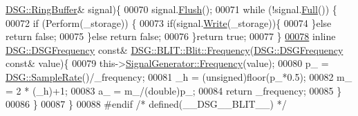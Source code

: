 \begin{DoxyCode}
      \hyperlink{class_d_s_g_1_1_ring_buffer}{DSG::RingBuffer}& signal)\{
00070             signal.\hyperlink{class_d_s_g_1_1_ring_buffer_ab23c8003d2857809a816068eeb209d60}{Flush}();
00071             \textcolor{keywordflow}{while} (!signal.\hyperlink{class_d_s_g_1_1_ring_buffer_a53ddb04ffcbb5470a8d2b0a3c65b70cb}{Full}()) \{
00072                 \textcolor{keywordflow}{if} (Perform(\_storage)) \{
00073                     \textcolor{keywordflow}{if}(signal.\hyperlink{class_d_s_g_1_1_ring_buffer_aa5dd2caa0a270173251faee40a43d692}{Write}(\_storage))\{
00074                     \}\textcolor{keywordflow}{else} \textcolor{keywordflow}{return} \textcolor{keyword}{false};
00075                 \}\textcolor{keywordflow}{else} \textcolor{keywordflow}{return} \textcolor{keyword}{false};
00076             \}\textcolor{keywordflow}{return} \textcolor{keyword}{true};
00077         \}
\hypertarget{_b_l_i_t_8h_source_l00078}{}\hyperlink{class_d_s_g_1_1_b_l_i_t_1_1_blit_a933f8f9f324a4fde4f9e2b69473d88ed}{00078}         \textcolor{keyword}{inline} \hyperlink{namespace_d_s_g_a4315a061386fa1014fda09b15d3a6973}{DSG::DSGFrequency} \textcolor{keyword}{const}& 
      \hyperlink{class_d_s_g_1_1_phasor_a6bdec1d2722e2fa5c7173ac5f7adf682}{DSG::BLIT::Blit::Frequency}(\hyperlink{namespace_d_s_g_a4315a061386fa1014fda09b15d3a6973}{DSG::DSGFrequency} \textcolor{keyword}{const}& value)\{
00079             this->\hyperlink{class_d_s_g_1_1_phasor_a6bdec1d2722e2fa5c7173ac5f7adf682}{SignalGenerator::Frequency}(value);
00080             p\_ = \hyperlink{namespace_d_s_g_a72df05177db0412c3590070923f62819}{DSG::SampleRate}()/\_frequency;
00081             \_h = (unsigned)floor(p\_*0.5);
00082             m\_ = 2 * (\_h)+1;
00083             a\_ = m\_/(double)p\_;
00084             \textcolor{keywordflow}{return} \_frequency;
00085         \}
00086     \}
00087 \}
00088 \textcolor{preprocessor}{#endif }\textcolor{comment}{/* defined(\_\_DSG\_\_BLIT\_\_) */}\textcolor{preprocessor}{}
\end{DoxyCode}
